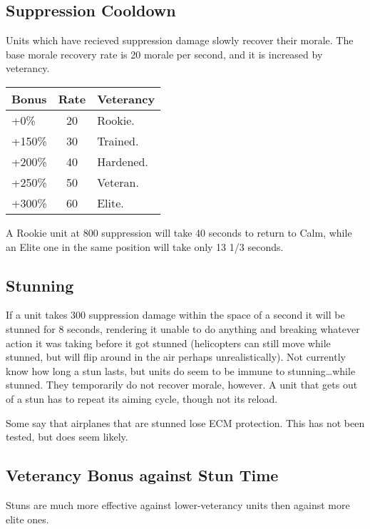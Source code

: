 \documentclass{article}
\begin{document}
\subsection{Suppression Cooldown}

Units which have recieved suppression damage slowly recover their morale. The
base morale recovery rate is 20 morale per second, and it is increased by
veterancy.

\begin{center}
    \begin{tabular}{ | l | c | l | }
    \hline
    Bonus & Rate & Veterancy \\ \hline
    +0\% & 20 & Rookie. \\
    +150\% & 30 & Trained. \\
    +200\% & 40 & Hardened. \\
    +250\% & 50 & Veteran. \\
    +300\% & 60 & Elite. \\
    \hline
    \end{tabular}
\end{center}

A Rookie unit at 800 suppression will take 40 seconds to return to Calm, while
an Elite one in the same position will take only 13 1/3 seconds.

\subsection{Stunning}

If a unit takes 300 suppression damage within the space of a second it will be
stunned for 8 seconds, rendering it unable to do anything and breaking whatever
action it was taking before it got stunned (helicopters can still move while stunned, but
will flip around in the air perhaps unrealistically). Not currently know how
long a stun lasts, but units do seem to be immune to stunning\ldots while
stunned. They temporarily do not recover morale, however. A unit that gets out
of a stun has to repeat its aiming cycle, though not its reload.

Some say that airplanes that are stunned lose ECM protection. This has not been
tested, but does seem likely.

\subsection{Veterancy Bonus against Stun Time}

Stuns are much more effective against lower-veterancy units then against more
elite ones.
\end{document}
